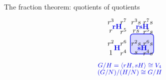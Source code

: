 \documentclass[8pt, handout]{beamer}
\begin{document}
\begin{frame}{The fraction theorem: quotients of quotients}
\[\begin{tikzpicture}[xscale=.9,scale=.7]
\begin{scope}[shift={(11,0)}]
\begin{scope}[shift={(0,3.5)}]
        \draw[thick,xBlue,fill=cosetBlue,rounded corners] (2.05,.1) rectangle (3.9,1.55);   
        \node at (.5,2.45) {$r^3$};
        \node at (1.5,2.45) {$r^7$};
        \node at (.5,1.75) {$r$};
        \node at (1.5,1.75) {$r^5$};
        \node at (2.5,2.45) {$r^3s$};
        \node at (3.45,2.45) {$r^7s$};
        \node at (2.5,1.75) {$rs$};
        \node at (3.45,1.75) {$r^5s$};
        \node at (.5,.9) {$r^2$};
        \node at (1.5,.9) {$r^6$};
        \node at (.5,.2) {$1$};
        \node at (1.5,.2) {$r^4$};
        \node at (2.5,.9) {$r^2s$};
        \node at (3.45,.9) {$r^6s$};
        \node at (2.5,.2) {$s$};
        \node at (3.45,.2) {$r^4s$};
        \node at (1,2.1) {\normalsize\Balert{$\mathbf{rH}$}};
        \node at (1,.55) {\normalsize\Balert{$\mathbf{H}$}};
        \node at (3,2.1) {\normalsize\Balert{$\mathbf{rsH}$}};
        \node at (3,.55) {\normalsize\Balert{$\mathbf{sH}$}};
        \node at (2,-.75) {\small\Balert{$G/H=\<rH,sH\>\cong V_4$}};
        \node at (2,-1.25) {\small\Balert{$(G/N)/(H/N)\cong G/H$}};
      \end{scope}
    \end{scope}
  \end{tikzpicture}
  \]
  


\end{frame}
\end{document}
